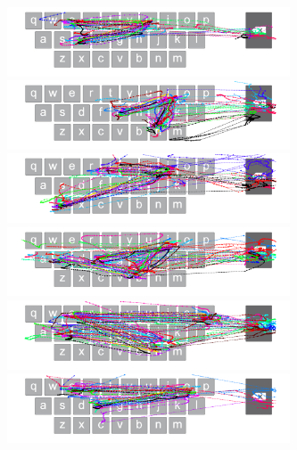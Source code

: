 \begin{figure}[t]
    \centering
	\begin{minipage}[t]{8in}
	\hspace{-20pt}
	\begin{minipage}[t]{3.1in}
		\includegraphics[width=3.3in]{Figures/fig_due_paths}
	\end{minipage}
	\begin{minipage}[t]{3in}
		\includegraphics[width=3.3in]{Figures/fig_gin_paths}
	\end{minipage}
	\end{minipage}
	
	\begin{minipage}[t]{8in}
	\hspace{-20pt}
	\begin{minipage}[t]{3.1in}
		\includegraphics[width=3.3in]{Figures/fig_zit_paths}
	\end{minipage}
	\begin{minipage}[t]{3in}
		\includegraphics[width=3.3in]{Figures/fig_fibs_paths}
	\end{minipage}
	\end{minipage}
	
	\begin{minipage}[t]{8in}
	\hspace{-20pt}
	\begin{minipage}[t]{3.1in}
		\includegraphics[width=3.3in]{Figures/fig_pens_paths}
	\end{minipage}
	\begin{minipage}[t]{3in}
		\includegraphics[width=3.3in]{Figures/fig_fore_paths}
	\end{minipage}
	\end{minipage}
	

\end{figure}
